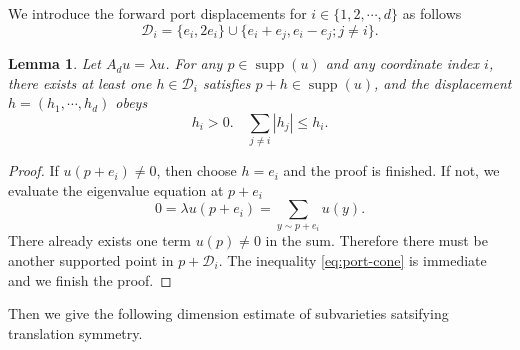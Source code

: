 \documentclass[11pt,reqno]{amsart}
\newcommand{\supp}{\operatorname{supp}}
\newtheorem{lemma}[theorem]{Lemma}
\theoremstyle{definition}
\theoremstyle{plain}
\numberwithin{equation}{section}
\begin{document}
We introduce the forward port displacements for $i\in \lbrace 1,2,\cdots,d\rbrace$ as follows
\begin{equation*}
    \mathcal{D}_i=\lbrace e_i,2e_i\rbrace \cup \lbrace e_i+e_j,e_i-e_j;j\neq i\rbrace.
\end{equation*}

\begin{lemma}\label{lem:ports}
    Let $A_d u  =\lambda u$. For any $p\in \supp (u)$ and any coordinate index $i$, there exists at least one $h\in \mathcal{D}_i$ satisfies $p+h\in\supp(u)$, and the displacement $h=(h_1,\cdots,h_d)$ obeys
    \begin{equation}\label{eq:port-cone}
        h_i>0. \quad \sum_{j\neq i}|h_j|\le h_i.
    \end{equation}
\end{lemma}
\begin{proof}
    If $u(p+e_i)\neq 0$, then choose $h=e_i$ and the proof is finished. If not, we evaluate the eigenvalue equation at $p+e_i$
    \begin{equation*}
        0=\lambda u (p+e_i)=\sum_{y\sim p+e_i} u(y).
    \end{equation*}
    There already exists one term $u(p)\neq 0$ in the sum. Therefore there must be another supported point in $p+\mathcal{D}_i$. The inequality \eqref{eq:port-cone} is immediate and we finish the proof.
\end{proof}


Then we give the following dimension estimate of subvarieties satsifying translation symmetry.
\end{document}
